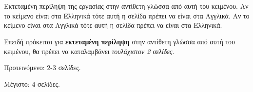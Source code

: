 \chapter*{\cseextabstract}
\addstarredchapter{\cseextabstract} %
\makecseextabstract


\noindent Εκτεταμένη περίληψη της εργασίας στην αντίθετη γλώσσα από αυτή του κειμένου.
Αν το κείμενο είναι στα Ελληνικά τότε αυτή η σελίδα πρέπει να είναι στα Αγγλικά.
Αν το κείμενο είναι στα Αγγλικά τότε αυτή η σελίδα πρέπει να είναι στα Ελληνικά.

Επειδή πρόκειται για \textbf{εκτεταμένη περίληψη} στην αντίθετη γλώσσα από 
αυτή του κειμένου, θα πρέπει να καταλαμβάνει \textit{τουλάχιστον 2 σελίδες}.

\bigskip

\noindent Προτεινόμενο: 2-3 σελίδες.

\noindent Μέγιστο: 4 σελίδες.
